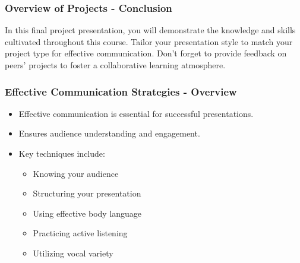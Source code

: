 \documentclass[aspectratio=169]{beamer}
\begin{document}
\begin{frame}[fragile]
    \frametitle{Overview of Projects - Conclusion}
    In this final project presentation, you will demonstrate the knowledge and skills cultivated throughout this course. Tailor your presentation style to match your project type for effective communication. Don't forget to provide feedback on peers’ projects to foster a collaborative learning atmosphere.
\end{frame}

\begin{frame}[fragile]
    \frametitle{Effective Communication Strategies - Overview}
    \begin{itemize}
        \item Effective communication is essential for successful presentations.
        \item Ensures audience understanding and engagement.
        \item Key techniques include:
        \begin{itemize}
            \item Knowing your audience
            \item Structuring your presentation
            \item Using effective body language
            \item Practicing active listening
            \item Utilizing vocal variety
        \end{itemize}
    \end{itemize}
\end{frame}
\end{document}
